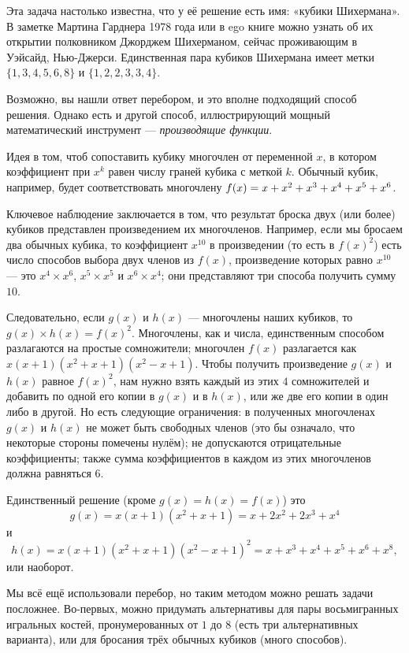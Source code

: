 Эта задача настолько известна, что у её решение есть имя: «кубики Шихермана».
В заметке Мартина Гарднера 1978 года \cite{gardner1978} или в ego книге \cite{gardner1989} можно узнать об их открытии полковником Джорджем Шихерманом, сейчас проживающим в Уэйсайд, Нью-Джерси.
Единственная пара кубиков Шихермана имеет метки $\{1, 3, 4, 5, 6, 8\}$ и $\{1, 2, 2, 3, 3, 4\}$.

Возможно, вы нашли ответ перебором, и это вполне подходящий способ решения.
Однако есть и другой способ, иллюстрирующий мощный математический инструмент --- \emph{производящие функции}.

Идея в том, чтоб сопоставить кубику многочлен от переменной $x$, в котором коэффициент при $x^k$ равен числу граней кубика с меткой $k$.
Обычный кубик, например, будет соответствовать многочлену $f(x) = x \z+ x^2 \z+ x^3 \z+ x^4 \z+ x^5 \z+ x^6$.

Ключевое наблюдение заключается в том, что результат броска двух (или более) кубиков представлен произведением их многочленов.
Например, если мы бросаем два обычных кубика, то коэффициент $x^{10}$ в произведении (то есть в $f(x)^2$) есть число способов выбора двух членов из $f(x)$, произведение которых равно $x^{10}$ ---
это $x^4 \times x^6$, $x^5 \times x^5$ и $x^6 \times x^4$; они представляют три способа получить сумму $10$.

Следовательно, если $g(x)$ и $h(x)$ --- многочлены наших кубиков, то $g(x) \times h(x) = f(x)^2$.
Многочлены, как и числа, единственным способом разлагаются на простые сомножители;
многочлен $f(x)$ разлагается как $x(x + 1)(x^2 + x + 1)(x^2 - x + 1)$.
Чтобы получить произведение $g(x)$ и $h(x)$ равное $f(x)^2$, нам нужно взять каждый из этих $4$ сомножителей и добавить по одной его копии в $g(x)$ и в $h(x)$, или же две его копии в один либо в другой.
Но есть следующие ограничения:
в полученных многочленах $g(x)$ и $h(x)$ не может быть свободных членов (это бы означало, что некоторые стороны помечены нулём);
не допускаются отрицательные коэффициенты;
также сумма коэффициентов в каждом из этих многочленов должна равняться 6.


Единственный решение (кроме $g(x) = h(x) = f(x)$) это
\[g(x)
=
x(x + 1)(x^2 + x + 1)
=
x + 2x^2 + 2x^3 + x^4\]
и
\[h(x)
=
x(x + 1)(x^2 + x + 1)(x^2 - x + 1)^2
=
x + x^3 + x^4 + x^5 + x^6 + x^8,\]
или наоборот.

Мы всё ещё использовали перебор, но таким методом можно решать задачи посложнее.
Во-первых, можно придумать альтернативы для пары восьмигранных игральных костей, пронумерованных от $1$ до $8$ (есть три альтернативных варианта), или для бросания трёх обычных кубиков (много способов).

